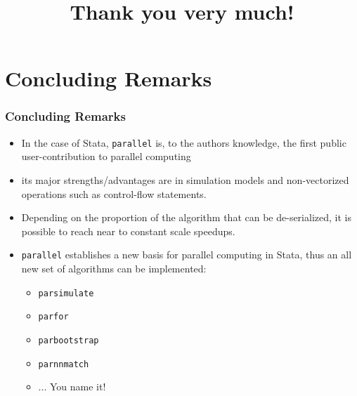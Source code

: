 \documentclass[9pt,handout]{beamer}
\begin{document}
\section{Concluding Remarks}

\begin{frame}
\frametitle{Concluding Remarks}

\begin{itemize}
\item In the case of Stata, {\tt parallel} is, to the authors knowledge, the first public user-contribution to parallel computing\pause
\item its major strengths/advantages are in simulation models and non-vectorized operations such as control-flow statements.\pause
\item Depending on the proportion of the algorithm that can be de-serialized, it is possible to reach near to constant scale speedups.\pause
\item {\tt parallel} establishes a new basis for parallel computing in Stata,\pause{}
thus an all new set of algorithms can be implemented:\pause
\begin{itemize}
\item {\tt parsimulate}\pause
\item {\tt parfor}\pause
\item {\tt parbootstrap}\pause
\item {\tt parnnmatch}\pause
\item ... {\large You name it!}
\end{itemize}
\end{itemize}

\end{frame}

\title{Thank you very much!}

\frame{\maketitle
}
\end{document}
